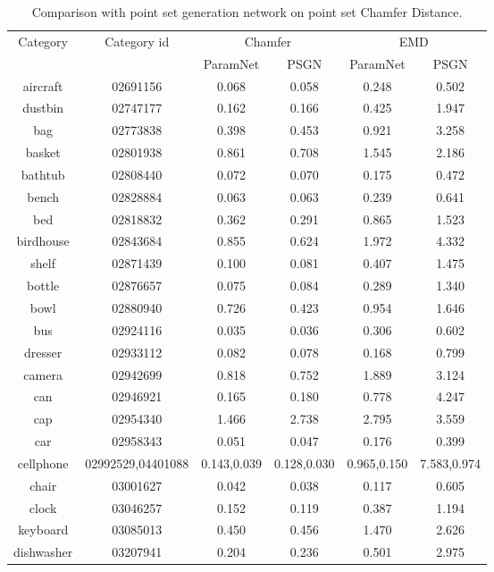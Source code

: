 \begin{table}
	\caption{Comparison with point set generation network on point set Chamfer Distance. }
	\label{tab:seg}
	\centering
	\begin{tabular}{c c c c c c}
		\multirow{2}{*}{Category} & \multirow{2}{*}{Category id} & \multicolumn{2}{c}{Chamfer} & \multicolumn{2}{c}{EMD}\\ \cmidrule(lr){3-4} \cmidrule(lr){5-6}
			&	& ParamNet & PSGN\cite{PSGN}       & ParamNet & PSGN\cite{PSGN}\\
		\hline
		aircraft & 02691156 & 0.068 & 0.058 & 0.248 & 0.502 \\   
		dustbin & 02747177 & 0.162 & 0.166 & 0.425 & 1.947 \\
		bag & 02773838  & 0.398 & 0.453 & 0.921 & 3.258 \\
		basket & 02801938 & 0.861 & 0.708 & 1.545 & 2.186 \\
		bathtub & 02808440 & 0.072 & 0.070 & 0.175 & 0.472 \\
		bench & 02828884 & 0.063 & 0.063 & 0.239 & 0.641 \\
		bed & 02818832 & 0.362 & 0.291 & 0.865 & 1.523 \\
		birdhouse & 02843684 & 0.855 & 0.624 & 1.972 & 4.332 \\
		shelf & 02871439 & 0.100 & 0.081 & 0.407 & 1.475 \\
		bottle & 02876657 & 0.075 & 0.084 & 0.289 & 1.340 \\
		bowl & 02880940 & 0.726 & 0.423 & 0.954 & 1.646 \\
		bus & 02924116 & 0.035 & 0.036 & 0.306 & 0.602\\
		dresser & 02933112 & 0.082 & 0.078 & 0.168 & 0.799 \\
		camera & 02942699 & 0.818 & 0.752 & 1.889 & 3.124 \\
		can & 02946921 & 0.165 & 0.180 & 0.778 & 4.247 \\
		cap & 02954340 & 1.466 & 2.738 & 2.795 & 3.559 \\
		car & 02958343 & 0.051 & 0.047 & 0.176 & 0.399 \\
		cellphone & 02992529,04401088 & 0.143,0.039 & 0.128,0.030& 0.965,0.150 & 7.583,0.974\\
		chair & 03001627 & 0.042 & 0.038 & 0.117 & 0.605 \\
		clock & 03046257 & 0.152 & 0.119 & 0.387 & 1.194 \\
		keyboard & 03085013 & 0.450 & 0.456 & 1.470 & 2.626\\
		dishwasher & 03207941 & 0.204 & 0.236 & 0.501 & 2.975 \\

\end{tabular}
\end{table}
